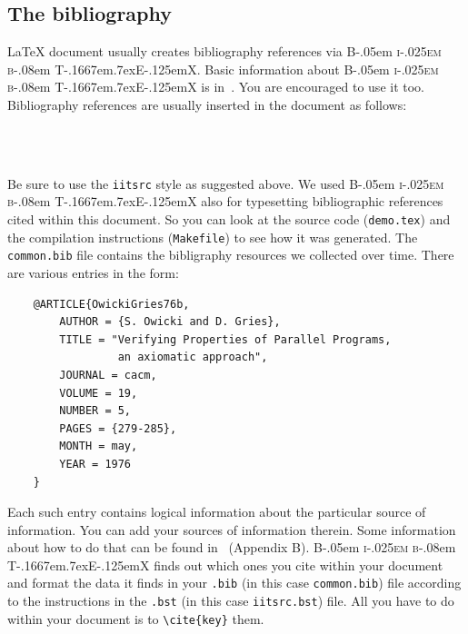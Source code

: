 \documentclass{iitsrc}
\begin{document}
\begin{multicols}{2}
\section{The bibliography}
%

\def\BibTeX{{\rmfamily B\kern-.05em%
    \textsc{i\kern-.025em b}\kern-.08em%
    T\kern-.1667em\lower.7ex\hbox{E}\kern-.125emX}}

\LaTeX{} document usually creates bibliography references via \BibTeX.
Basic information about \BibTeX{} is in~\cite{lamport:latex}. You are
encouraged to use it too. Bibliography references are usually inserted
in the document as follows:
\begin{lstlisting}
   
   
\end{lstlisting}
Be sure to use the \verb|iitsrc| style as suggested above. We used \BibTeX{}
also for typesetting bibliographic references cited within this
document. So you can look at the source code ({\tt demo.tex}) and the
compilation instructions ({\tt Makefile}) to see how it was
generated. The {\tt common.bib} file contains the bibligraphy resources
we collected over time. There are various entries in the form:
\begin{lstlisting}
    @ARTICLE{OwickiGries76b,
        AUTHOR = {S. Owicki and D. Gries},
        TITLE = "Verifying Properties of Parallel Programs,
                 an axiomatic approach",
        JOURNAL = cacm,
        VOLUME = 19,
        NUMBER = 5,
        PAGES = {279-285},
        MONTH = may,
        YEAR = 1976
    }
\end{lstlisting}
Each such entry contains logical information about the particular source
of information. You can add your sources of information therein. Some
information about how to do that can be found in~\cite{lamport:latex}
(Appendix B).  \BibTeX{} finds out which ones you cite within your
document and format the data it finds in your {\tt *.bib} (in this case
{\tt common.bib}) file according to the instructions in the {\tt *.bst}
(in this case {\tt iitsrc.bst}) file. All you have to do within your
document is to \verb|\cite{key}| them.


\end{multicols}
\end{document}
